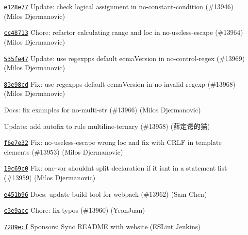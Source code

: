 \begin{DoxyItemize}
\item \href{https://github.com/eslint/eslint/commit/e128e775e9fa116a0ad68a071f1f0997589f8cd4}{\texttt{ {\ttfamily e128e77}}} Update\+: check logical assignment in no-\/constant-\/condition (\#13946) (Milos Djermanovic)
\item \href{https://github.com/eslint/eslint/commit/cc4871369645c3409dc56ded7a555af8a9f63d51}{\texttt{ {\ttfamily cc48713}}} Chore\+: refactor calculating range and loc in no-\/useless-\/escape (\#13964) (Milos Djermanovic)
\item \href{https://github.com/eslint/eslint/commit/535fe47fee6544b4957378f9408117c8318d4762}{\texttt{ {\ttfamily 535fe47}}} Update\+: use regexpp\textquotesingle{}s default ecma\+Version in no-\/control-\/regex (\#13969) (Milos Djermanovic)
\item \href{https://github.com/eslint/eslint/commit/83e98cd48ce3d1acf729f4fb9be40cff332abd6e}{\texttt{ {\ttfamily 83e98cd}}} Fix\+: use regexpp\textquotesingle{}s default ecma\+Version in no-\/invalid-\/regexp (\#13968) (Milos Djermanovic)
\item \href{https://github.com/eslint/eslint/commit/7297363ea355d0e3b2a74aaec586126deb91fd93}{\texttt{ {}}} Docs\+: fix examples for no-\/multi-\/str (\#13966) (Milos Djermanovic)
\item \href{https://github.com/eslint/eslint/commit/06498716bfba65ed8c7217917a29a07ad267193a}{\texttt{ {}}} Update\+: add autofix to rule multiline-\/ternary (\#13958) (薛定谔的猫)
\item \href{https://github.com/eslint/eslint/commit/f6e7e3231bc43c989f8c953de8e0d328bac5eea0}{\texttt{ {\ttfamily f6e7e32}}} Fix\+: no-\/useless-\/escape wrong loc and fix with CRLF in template elements (\#13953) (Milos Djermanovic)
\item \href{https://github.com/eslint/eslint/commit/19c69c0293a98634ff0d4884a0cdabc1213ebcb4}{\texttt{ {\ttfamily 19c69c0}}} Fix\+: one-\/var shouldn\textquotesingle{}t split declaration if it isn\textquotesingle{}t in a statement list (\#13959) (Milos Djermanovic)
\item \href{https://github.com/eslint/eslint/commit/e451b9664aface32ad9321eaf5619c875dc76553}{\texttt{ {\ttfamily e451b96}}} Docs\+: update build tool for webpack (\#13962) (Sam Chen)
\item \href{https://github.com/eslint/eslint/commit/c3e9accce2f61b04ab699fd37c90703305281aa3}{\texttt{ {\ttfamily c3e9acc}}} Chore\+: fix typos (\#13960) (Yeon\+Juan)
\item \href{https://github.com/eslint/eslint/commit/7289ecf58ed0d2e7f0ad7f1e5004c8927a7bf805}{\texttt{ {\ttfamily 7289ecf}}} Sponsors\+: Sync README with website (ESLint Jenkins)
\end{DoxyItemize}

